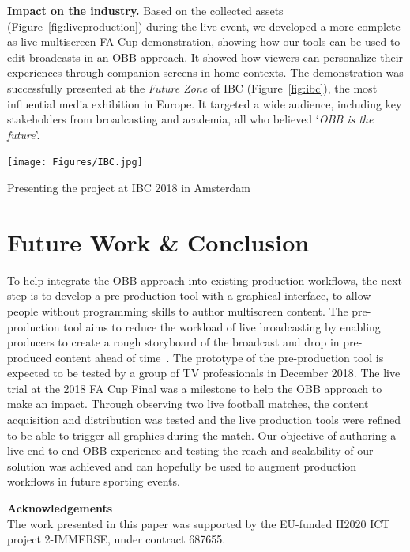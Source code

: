 \documentclass[sigchi-a, authorversion]{acmart}
\begin{document}
\vspace{5pt}\noindent\textbf{Impact on the industry.} Based on the collected assets
(Figure~\ref{fig:liveproduction}) during the live event, we developed a more complete as-live multiscreen
FA Cup demonstration, showing how our tools can be used to edit broadcasts
in an OBB approach. It showed how viewers can personalize their experiences
through companion screens in home contexts. The demonstration was successfully
presented at the \emph{Future Zone} of IBC (Figure~\ref{fig:ibc}), the most
influential media exhibition in Europe. It targeted a wide audience, including
key stakeholders from broadcasting and academia, all who believed `\emph{OBB is the future}'.

\begin{marginfigure}
    \vspace{0.5pc}
    \hspace*{-1cm}
    \texttt{[image: Figures/IBC.jpg]}
    \caption{Presenting the project at IBC 2018 in Amsterdam}
    \label{fig:ibc}
\end{marginfigure}

\section{Future Work \& Conclusion}

To help integrate the OBB approach into existing production workflows, the next
step is to develop a pre-production tool with a graphical interface, to allow
people without programming skills to author multiscreen content. The pre-production
tool aims to reduce the workload of live broadcasting by enabling producers to
create a rough storyboard of the broadcast and drop in pre-produced content ahead
of time~\cite{Li:2018_TVX}. The prototype of the pre-production tool is expected
to be tested by a group of TV professionals in December 2018. The live trial at
the 2018 FA Cup Final was a milestone to help the OBB approach to make an impact.
Through observing two live football matches, the content acquisition and distribution
was tested and the live production tools were refined to be able to trigger all graphics during the match.
Our objective of authoring a live end-to-end OBB experience and testing the
reach and scalability of our solution was achieved and can hopefully be used to
augment production workflows in future sporting events.

\begin{sidebar}
    \vspace{2pc}
    \noindent\textbf{Acknowledgements}\\
    \noindent The work presented in this paper was supported by the EU-funded
    H2020 ICT project 2-IMMERSE, under contract 687655.
\end{sidebar}



\end{document}
